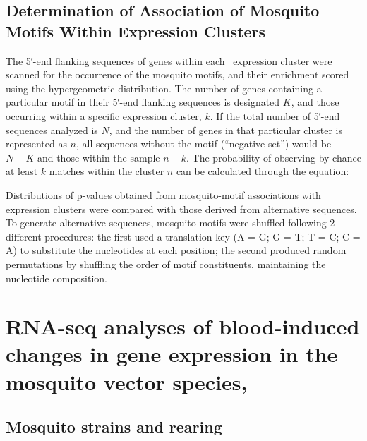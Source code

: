 \subsection{Determination of Association of Mosquito Motifs Within Expression Clusters}
The 5′-end flanking sequences of genes within each \Ag\ expression cluster were scanned for the occurrence of the mosquito motifs, and their enrichment scored using the hypergeometric distribution.
The number of genes containing a particular motif in their 5′-end flanking sequences is designated $K$, and those occurring within a specific expression cluster, $k$.
If the total number of 5′-end sequences analyzed is $N$, and the number of genes in that particular cluster is represented as $n$, all sequences without the motif (“negative set”) would be $N - K$ and those within the sample $n - k$.
The probability of observing by chance at least $k$ matches within the cluster $n$ can be calculated through the equation:



Distributions of p-values obtained from mosquito-motif associations with expression clusters were compared with those derived from alternative sequences.
To generate alternative sequences, mosquito motifs were shuffled following 2 different procedures: the first used a translation key (A = G; G = T; T = C; C = A) to substitute the nucleotides at each position; the second produced random permutations by shuffling the order of motif constituents, maintaining the nucleotide composition.


\section{RNA-seq analyses of blood-induced changes in gene expression in the mosquito vector species, \Aea}

\subsection{Mosquito strains and rearing}

